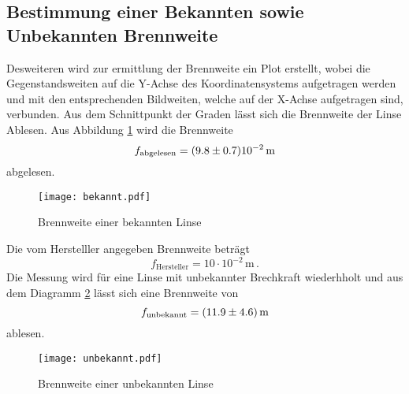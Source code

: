 \subsection{Bestimmung einer Bekannten sowie Unbekannten Brennweite}
Desweiteren wird zur ermittlung der Brennweite ein Plot erstellt, wobei die Gegenstandsweiten auf die Y-Achse des Koordinatensystems aufgetragen werden und mit den entsprechenden Bildweiten, welche auf der X-Achse aufgetragen sind, verbunden. Aus dem Schnittpunkt der Graden lässt sich die Brennweite der Linse Ablesen. Aus Abbildung \ref{fig:fibek} wird die Brennweite
\begin{equation}
  f_\text{abgelesen} = (\num{9.8 +- 0.7}) 10^{-2} \, \text{m}
  \label{eqn:fbek}
\end{equation} abgelesen. 
\begin{figure}
  \centering
  \texttt{[image: bekannt.pdf]}
  \caption{Brennweite einer bekannten Linse}
  \label{fig:fibek}
\end{figure}
Die vom Herstelller angegeben Brennweite beträgt 
\begin{equation}
  f_\text{Hersteller} = 10\cdot10^{-2}  \, \text{m} \, .
  \label{eqn:fHer}
\end{equation}
Die Messung wird für eine Linse mit unbekannter Brechkraft wiederhholt und aus dem Diagramm \ref{fig:fiunb} lässt sich eine Brennweite von 
\begin{equation}
  f_\text{unbekannt} = (\num{11.9 +- 4.6}) \, \text{m}
  \label{eqn:unb}
\end{equation}
ablesen.
\begin{figure}
  \centering
  \texttt{[image: unbekannt.pdf]}
  \caption{Brennweite einer unbekannten Linse}
  \label{fig:fiunb}
\end{figure}

